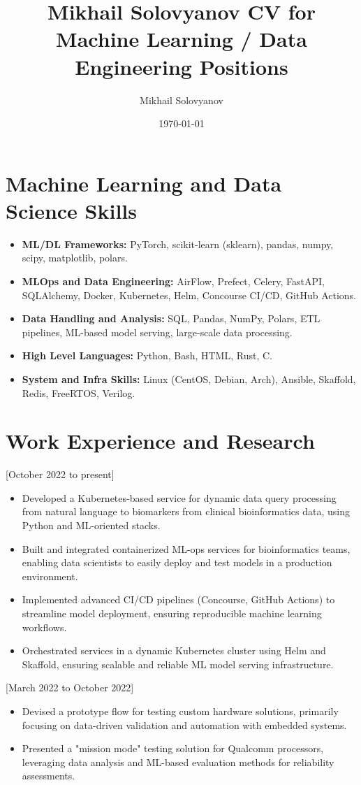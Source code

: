 \documentclass{article}
\title{ Mikhail Solovyanov CV for Machine Learning / Data Engineering Positions}
\author{Mikhail Solovyanov}
\date{\today}
\begin{document}
\makecvtitle

\section{Machine Learning and Data Science Skills}

\begin{itemize}
   \item \textbf{ML/DL Frameworks:} PyTorch, scikit-learn (sklearn), pandas, numpy, scipy, matplotlib, polars.
   \item \textbf{MLOps and Data Engineering:} AirFlow, Prefect, Celery, FastAPI, SQLAlchemy, Docker, Kubernetes, Helm, Concourse CI/CD, GitHub Actions.
   \item \textbf{Data Handling and Analysis:} SQL, Pandas, NumPy, Polars, ETL pipelines, ML-based model serving, large-scale data processing.
   \item \textbf{High Level Languages:} Python, Bash, HTML, Rust, C.
   \item \textbf{System and Infra Skills:} Linux (CentOS, Debian, Arch), Ansible, Skaffold, Redis, FreeRTOS, Verilog.
\end{itemize}

\section{Work Experience and Research}
[October 2022 to present]
\begin{itemize}
   \item Developed a Kubernetes-based service for dynamic data query processing from natural language to biomarkers from clinical bioinformatics data, using Python and ML-oriented stacks.
   \item Built and integrated containerized ML-ops services for bioinformatics teams, enabling data scientists to easily deploy and test models in a production environment.
   \item Implemented advanced CI/CD pipelines (Concourse, GitHub Actions) to streamline model deployment, ensuring reproducible machine learning workflows.
   \item Orchestrated services in a dynamic Kubernetes cluster using Helm and Skaffold, ensuring scalable and reliable ML model serving infrastructure.
\end{itemize}

[March 2022 to October 2022]
\begin{itemize}
   \item Devised a prototype flow for testing custom hardware solutions, primarily focusing on data-driven validation and automation with embedded systems.
   \item Presented a "mission mode" testing solution for Qualcomm processors, leveraging data analysis and ML-based evaluation methods for reliability assessments.
\end{itemize}
\end{document}
